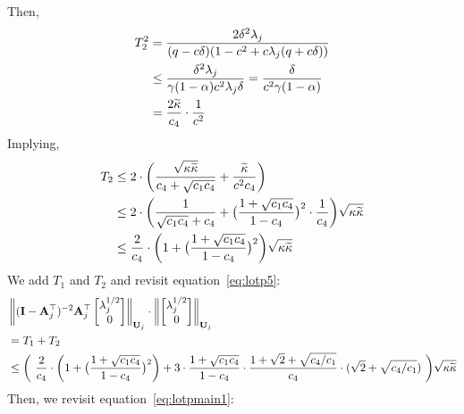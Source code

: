 Then,
\begin{align*}
T_2^{2}&=\frac{2\delta^2\lambda_j}{(q -c\delta)(1-c^2+c\lambda_j(q +c\delta))}\\
&\leq\frac{\delta^2\lambda_j}{\gamma(1-\alpha)c^2\lambda_j\delta}=\frac{\delta}{c^2\gamma(1-\alpha)}\\
&=\frac{2\widetilde{\kappa}}{c_4}\cdot\frac{1}{c^2}
\end{align*}
Implying,
\begin{align}
\label{eq:t2final}
T_2&\leq2\cdot\bigg(\frac{\sqrt{{\kappa}\widetilde{\kappa}}}{c_4+\sqrt{c_1c_4}}+\frac{\widetilde{\kappa}}{c^2c_4}\bigg)\nonumber\\
&\leq2\cdot\bigg(\frac{1}{\sqrt{c_1c_4}+c_4}+\big(\frac{1+\sqrt{c_1c_4}}{1-c_4}\big)^2\cdot\frac{1}{c_4}\bigg)\sqrt{{\kappa}\widetilde{\kappa}}\nonumber\\
&\leq\frac{2}{c_4}\cdot\bigg(1+\big(\frac{1+\sqrt{c_1c_4}}{1-c_4}\big)^2\bigg)\sqrt{{\kappa}\widetilde{\kappa}}
\end{align}
We add $T_1$ and $T_2$ and revisit equation~\ref{eq:lotp5}:
\begin{align}
\label{eq:perDirectionBound}
&\adanorm{(\eye-\A_j\T)^{-2}\A_j\T\begin{bmatrix}\lambda_j^{1/2}\\0\end{bmatrix}}_{\U_j}\cdot\adanorm{\begin{bmatrix}\lambda_j^{1/2}\\0\end{bmatrix}}_{\U_j}\nonumber\\
&=T_1+T_2\nonumber\\
&\leq\bigg(\ \frac{2}{\cfour}\cdot\bigg(1+\big(\frac{1+\sqrt{\cone\cfour}}{1-\cfour}\big)^2\bigg) + 3 \cdot \frac{1+\sqrt{\cone\cfour}}{1-\cfour} \cdot \frac{1+\sqrt{2}+\sqrt{\cfour/\cone}}{\cfour} \cdot (\sqrt{2}+\sqrt{\cfour/\cone}) \ \bigg)\sqrt{\cnH\cnS}
\end{align}
Then, we revisit equation~\ref{eq:lotpmain1}:
